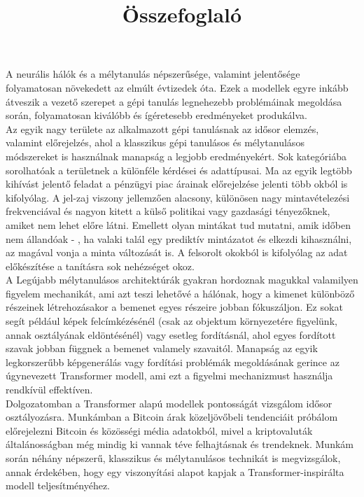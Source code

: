 \documentclass[12pt]{article}
\title{\vspace{-2.0cm}Összefoglaló}
\begin{document}
    \date{\vspace{-5ex}}
    \maketitle
    A neurális hálók és a mélytanulás népszerűsége, valamint jelentősége folyamatosan növekedett az elmúlt évtizedek óta.
    Ezek a modellek egyre inkább átveszik a vezető szerepet a gépi tanulás legnehezebb problémáinak megoldása során,
    folyamatosan kiválóbb és ígéretesebb eredményeket produkálva.\\
    \indent Az egyik nagy területe az alkalmazott gépi tanulásnak az idősor elemzés, valamint előrejelzés, ahol a klasszikus
    gépi tanulásos és mélytanulásos módszereket is használnak manapság a legjobb eredményekért.
    Sok kategóriába sorolhatóak a területnek a különféle kérdései és adattípusai. Ma az egyik legtöbb kihívást
    jelentő feladat a pénzügyi piac árainak előrejelzése jelenti több okból is kifolyólag. A jel-zaj viszony jellemzően alacsony,
    különösen nagy mintavételezési frekvenciával és nagyon kitett a külső politikai vagy gazdasági tényezőknek, amiket nem lehet
    előre látni. Emellett olyan mintákat tud mutatni, amik időben nem állandóak -
    , ha valaki talál egy prediktív mintázatot és elkezdi kihasználni, az magával vonja a minta változását is. A felsorolt
    okokból is kifolyólag az adat előkészítése a tanításra sok nehézséget okoz.\\
    \indent A Legújabb mélytanulásos architektúrák gyakran hordoznak magukkal valamilyen figyelem mechanikát, ami
    azt teszi lehetővé a hálónak, hogy a kimenet különböző részeinek létrehozásakor a bemenet egyes részeire jobban
    fókuszáljon. Ez sokat segít például képek felcímkézésénél (csak az objektum környezetére figyelünk, annak osztályának eldöntésénél)
    vagy esetleg fordításnál, ahol egyes fordított szavak jobban függnek a bemenet valamely szavaitól.
    Manapság az egyik legkorszerűbb képgenerálás vagy fordítási problémák megoldásának gerince az
    úgynevezett Transformer modell, ami ezt a figyelmi mechanizmust használja rendkívül effektíven.\\
    \indent Dolgozatomban a Transformer alapú modellek pontosságát vizsgálom idősor osztályozásra. Munkámban a Bitcoin
    árak közeljövőbeli tendenciáit próbálom előrejelezni Bitcoin és közösségi média adatokból, mivel a kriptovaluták
    általánosságban még mindig ki vannak téve felhajtásnak és trendeknek. Munkám során néhány népszerű, klasszikus és
    mélytanulásos technikát is megvizsgálok, annak érdekében, hogy egy viszonyítási alapot kapjak a Transformer-inspirálta
    modell teljesítményéhez.
\end{document}
